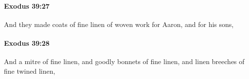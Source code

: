 		\paragraph{Exodus 39:27} %
			\label{EXODUS-39-27}

			And they made coats of fine linen of woven work for Aaron, and for his sons,


		\paragraph{Exodus 39:28} %
			\label{EXODUS-39-28}

			And a mitre of fine linen, and goodly bonnets of fine linen, and linen breeches of fine twined linen,


